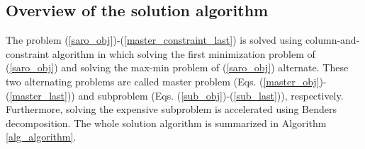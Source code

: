 \documentclass[final]{IEEEtran}
\begin{document}
\subsection{Overview of the solution algorithm}

The problem (\ref{saro_obj})-(\ref{master_constraint_last}) is solved using column-and-constraint algorithm in which solving the first minimization problem of (\ref{saro_obj}) and solving the max-min problem of (\ref{saro_obj}) alternate. These two alternating problems are called master problem (Eqs. (\ref{master_obj})-(\ref{master_last})) and subproblem (Eqs. (\ref{sub_obj})-(\ref{sub_last})), respectively. Furthermore, solving the expensive subproblem is accelerated using Benders decomposition. The whole solution algorithm is summarized in Algorithm \ref{alg_algorithm}.
\end{document}
